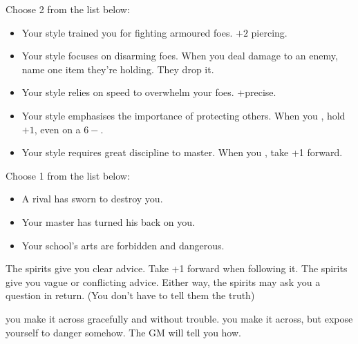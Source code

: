 Choose 2 from the list below:
\begin{itemize}
\item Your style trained you for fighting armoured foes. $+2$ piercing.
\item Your style focuses on disarming foes. When you deal damage to an enemy, name one item they're holding. They drop it.
\item Your style relies on speed to overwhelm your foes. +precise.
\item Your style emphasises the importance of protecting others. When you , hold $+1$, even on a $6-$.
\item Your style requires great discipline to master. When you , take +1 forward.
\end{itemize}

Choose 1 from the list below:
\begin{itemize}
\item A rival has sworn to destroy you.
\item Your master has turned his back on you.
\item Your school's arts are forbidden and dangerous.
\end{itemize}


{The spirits give you clear advice. Take +1 forward when following it.}
{The spirits give you vague or conflicting advice.}
Either way, the spirits may ask you a question in return. (You don't have to tell them the truth)

{you make it across gracefully and without trouble.}
{you make it across, but expose yourself to danger somehow. The GM will tell you how.}

